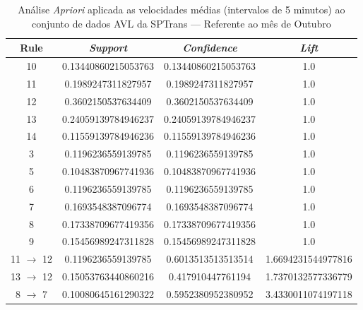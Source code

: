 \documentclass[
	12pt,				%
	oneside,			%
	a4paper,			%
	english,			%
	brazil				%
	]{abntex2ppgsi}
\begin{document}
\begin{apendicesenv}
\begin{table}[!htb]
\centering
\caption {Análise \textit{Apriori} aplicada as velocidades médias (intervalos de 5 minutos) ao conjunto de dados AVL da SPTrans --- Referente ao mês de Outubro}
\label {tab:aprioriOctober}
\begin{tabular}{c|c|c|c}
\hline
\textbf{Rule} & \textit{\textbf{Support}} & \textit{\textbf{Confidence}} & \textit{\textbf{Lift}} \\
\hline
10 &  0.13440860215053763 &  0.13440860215053763 &  1.0\\
\hline
11 &  0.1989247311827957 &  0.1989247311827957 &  1.0\\
\hline
12 &  0.3602150537634409 &  0.3602150537634409 &  1.0\\
\hline
13 &  0.24059139784946237 &  0.24059139784946237 &  1.0\\
\hline
14 &  0.11559139784946236 &  0.11559139784946236 &  1.0\\
\hline
3 &  0.1196236559139785 &  0.1196236559139785 &  1.0\\
\hline
5 &  0.10483870967741936 &  0.10483870967741936 &  1.0\\
\hline
6 &  0.1196236559139785 &  0.1196236559139785 &  1.0\\
\hline
7 &  0.1693548387096774 &  0.1693548387096774 &  1.0\\
\hline
8 &  0.17338709677419356 &  0.17338709677419356 &  1.0\\
\hline
9 &  0.15456989247311828 &  0.15456989247311828 &  1.0\\
\hline
11 $\rightarrow$ 12 &  0.1196236559139785 &  0.6013513513513514 &  1.6694231544977816\\
\hline
13 $\rightarrow$ 12 &  0.15053763440860216 &  0.417910447761194 &  1.7370132577336779\\
\hline
8 $\rightarrow$ 7 &  0.10080645161290322 &  0.5952380952380952 &  3.4330011074197118\\
\hline
\end{tabular}
\end{table}



\end{apendicesenv}
\end{document}

